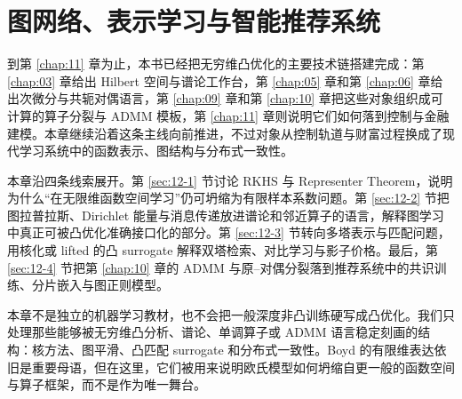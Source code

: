 \chapter{图网络、表示学习与智能推荐系统}

\label{chap:12}

到第 \ref{chap:11} 章为止，本书已经把无穷维凸优化的主要技术链搭建完成：第 \ref{chap:03} 章给出 Hilbert 空间与谱论工作台，第 \ref{chap:05} 章和第 \ref{chap:06} 章给出次微分与共轭对偶语言，第 \ref{chap:09} 章和第 \ref{chap:10} 章把这些对象组织成可计算的算子分裂与 ADMM 模板，第 \ref{chap:11} 章则说明它们如何落到控制与金融建模。本章继续沿着这条主线向前推进，不过对象从控制轨道与财富过程换成了现代学习系统中的函数表示、图结构与分布式一致性。

本章沿四条线索展开。第 \ref{sec:12-1} 节讨论 RKHS 与 Representer Theorem，说明为什么“在无限维函数空间学习”仍可坍缩为有限样本系数问题。第 \ref{sec:12-2} 节把图拉普拉斯、Dirichlet 能量与消息传递放进谱论和邻近算子的语言，解释图学习中真正可被凸优化准确接口化的部分。第 \ref{sec:12-3} 节转向多塔表示与匹配问题，用核化或 lifted 的凸 surrogate 解释双塔检索、对比学习与影子价格。最后，第 \ref{sec:12-4} 节把第 \ref{chap:10} 章的 ADMM 与原--对偶分裂落到推荐系统中的共识训练、分片嵌入与图正则模型。

本章不是独立的机器学习教材，也不会把一般深度非凸训练硬写成凸优化。我们只处理那些能够被无穷维凸分析、谱论、单调算子或 ADMM 语言稳定刻画的结构：核方法、图平滑、凸匹配 surrogate 和分布式一致性。Boyd 的有限维表达依旧是重要母语，但在这里，它们被用来说明欧氏模型如何坍缩自更一般的函数空间与算子框架，而不是作为唯一舞台。








